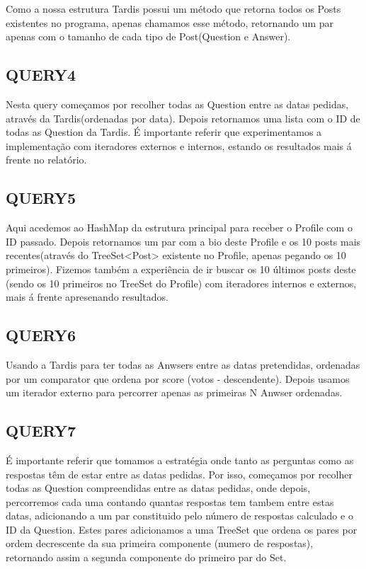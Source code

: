 \documentclass[letterpaper, 10 pt, conference]{IEEEtran} %
\begin{document}
Como a nossa estrutura Tardis possui um método que retorna todos os Posts existentes no programa, apenas chamamos esse método,
retornando um par apenas com o tamanho de cada tipo de Post(Question e Answer).

\subsection{QUERY4}

Nesta query começamos por recolher todas as Question entre as datas pedidas, através da Tardis(ordenadas por data).
Depois retornamos uma lista com o ID de todas as Question da Tardis.
\newline
É importante referir que experimentamos a implementação com iteradores externos e internos, estando os resultados mais á frente
no relatório.

\subsection{QUERY5}

Aqui acedemos ao HashMap da estrutura principal para receber o Profile com o ID passado. Depois retornamos um par com a bio deste Profile e os
10 posts mais recentes(através do TreeSet<Post> existente no Profile, apenas pegando os 10 primeiros).
Fizemos também a experiência de ir buscar os 10 últimos posts deste (sendo os 10 primeiros no TreeSet do Profile) com
iteradores internos e externos, mais á frente apresenando resultados.

\subsection{QUERY6}

Usando a Tardis para ter todas as Anwsers entre as datas pretendidas, ordenadas por um comparator 
que ordena por score (votos - descendente). Depois usamos um iterador externo para percorrer apenas as primeiras N Anwser ordenadas.

\subsection{QUERY7}

É importante referir que tomamos a estratégia onde tanto as perguntas como as respostas têm de estar entre as datas pedidas.
Por isso, começamos por recolher todas as Question compreendidas entre as datas pedidas, onde depois, percorremos cada uma contando quantas respostas tem tambem entre estas datas,
adicionando a um par constituido pelo número de respostas calculado e o ID da Question. Estes pares
adicionamos a uma TreeSet que ordena os pares por ordem decrescente da sua primeira componente (numero de respostas),
retornando assim a segunda componente do primeiro par do Set.
\end{document}
